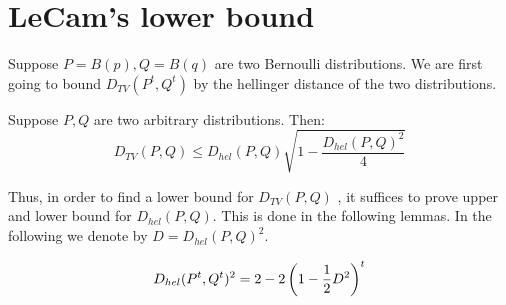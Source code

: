 \section{LeCam's lower bound}
Suppose $P = B(p), Q = B(q)$ are two Bernoulli distributions. 
We are first going to bound $D_{TV}(P^t, Q^t)$ by the hellinger distance of the two distributions.
\begin{lemma}\label{l:totalv_hell}
Suppose $P,Q$ are two arbitrary distributions. Then:
$$
D_{TV}(P,Q) \leq D_{hel}(P,Q) \sqrt{1-\frac{D_{hel}(P,Q)^2}{4}}
$$
\end{lemma}
Thus, in order to find a lower bound for $D_{TV}(P,Q)$ , it suffices 
to prove upper and lower bound for $D_{hel}(P,Q)$. This is done in the following lemmas. 
In the following we denote by $D = D_{hel}(P, Q)^2$.
\begin{lemma}\label{l:hell_n}
$$
D_{hel}(P^t, Q^t)^2 = 2 - 2\left(1 - \frac{1}{2}D^2\right)^t
$$
\end{lemma}

